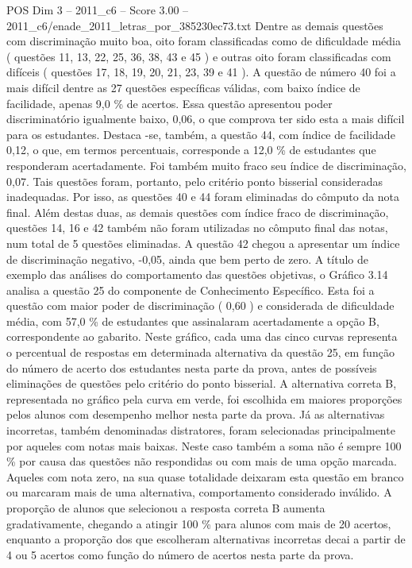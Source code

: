 \begin{textsample}{POS Dim 3 – 2011\_c6 – Score 3.00 – 2011\_c6/enade\_2011\_letras\_por\_385230ec73.txt}
Dentre as demais questões com discriminação muito boa, oito foram classificadas como de dificuldade média ( questões 11, 13, 22, 25, 36, 38, 43 e 45 ) e outras oito foram classificadas com difíceis ( questões 17, 18, 19, 20, 21, 23, 39 e 41 ).
A questão de número 40 foi a mais difícil dentre as 27 questões específicas válidas, com baixo índice de facilidade, apenas 9,0 \% de acertos.
Essa questão apresentou poder discriminatório igualmente baixo, 0,06, o que comprova ter sido esta a mais difícil para os estudantes.
Destaca -se, também, a questão 44, com índice de facilidade 0,12, o que, em termos percentuais, corresponde a 12,0 \% de estudantes que responderam acertadamente.
Foi também muito fraco seu índice de discriminação, 0,07.
Tais questões foram, portanto, pelo critério ponto bisserial consideradas inadequadas.
Por isso, as questões 40 e 44 foram eliminadas do cômputo da nota final.
Além destas duas, as demais questões com índice fraco de discriminação, questões 14, 16 e 42 também não foram utilizadas no cômputo final das notas, num total de 5 questões eliminadas.
A questão 42 chegou a apresentar um índice de discriminação negativo, -0,05, ainda que bem perto de zero.
A título de exemplo das análises do comportamento das questões objetivas, o Gráfico 3.14 analisa a questão 25 do componente de Conhecimento Específico.
Esta foi a questão com maior poder de discriminação ( 0,60 ) e considerada de dificuldade média, com 57,0 \% de estudantes que assinalaram acertadamente a opção B, correspondente ao gabarito.
Neste gráfico, cada uma das cinco curvas representa o percentual de respostas em determinada alternativa da questão 25, em função do número de acerto dos estudantes nesta parte da prova, antes de possíveis eliminações de questões pelo critério do ponto bisserial.
A alternativa correta B, representada no gráfico pela curva em verde, foi escolhida em maiores proporções pelos alunos com desempenho melhor nesta parte da prova.
Já as alternativas incorretas, também denominadas distratores, foram selecionadas principalmente por aqueles com notas mais baixas.
Neste caso também a soma não é sempre 100 \% por causa das questões não respondidas ou com mais de uma opção marcada.
Aqueles com nota zero, na sua quase totalidade deixaram esta questão em branco ou marcaram mais de uma alternativa, comportamento considerado inválido.
A proporção de alunos que selecionou a resposta correta B aumenta gradativamente, chegando a atingir 100 \% para alunos com mais de 20 acertos, enquanto a proporção dos que escolheram alternativas incorretas decai a partir de 4 ou 5 acertos como função do número de acertos nesta parte da prova.

\end{textsample}
